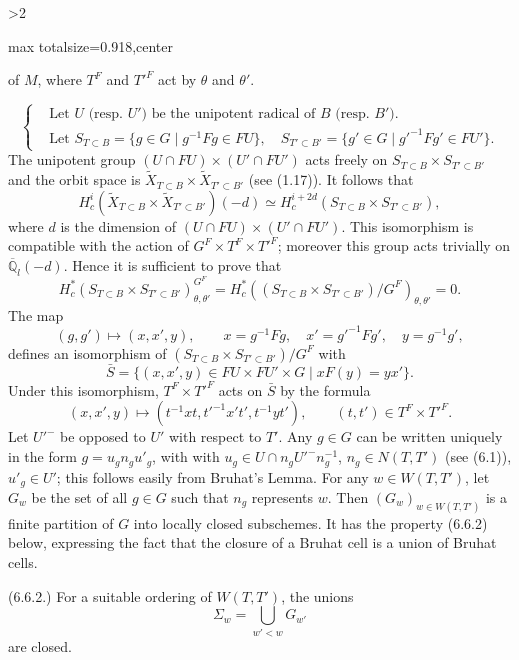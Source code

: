 \documentclass[9pt,twoside]{extarticle}
\newcommand{\EditionPage}[3]{%
  \ifnum#1>2\clearpage\fi
  \pdfbookmark[1]{Printed page #2}{en-folio-#2}%
  \hypertarget{en-physical-#1}{}%
  \noindent\begin{adjustbox}{max totalsize={\textwidth}{0.918\textheight},center}
  \begin{minipage}[t]{\textwidth}
  \fontsize{9.4}{11.1}\selectfont\justifying
  #3
  \end{minipage}
  \end{adjustbox}%
}
\begin{document}
\EditionPage{36}{137}{%
of \(M\), where \(T^F\) and \(T'^F\) act by \(\theta\) and \(\theta'\).\par

\[
\left\{
\begin{aligned}
&\text{Let }U\text{ (resp. }U'\text{) be the unipotent radical of }B\text{ (resp. }B'\text{).}\\
&\text{Let }S_{T\subset B}=\{g\in G\mid g^{-1}Fg\in FU\},\quad
S_{T'\subset B'}=\{g'\in G\mid g'^{-1}Fg'\in FU'\}.
\end{aligned}
\right.
\] The unipotent group \((U\cap FU)\times(U'\cap FU')\) acts freely on \(S_{T\subset B}\times S_{T'\subset B'}\) and the orbit space is \(\widetilde X_{T\subset B}\times\widetilde X_{T'\subset B'}\) (see (1.17)). It follows that \[
H_c^i(\widetilde X_{T\subset B}\times\widetilde X_{T'\subset B'})(-d)
\simeq
H_c^{i+2d}(S_{T\subset B}\times S_{T'\subset B'}),
\] where \(d\) is the dimension of \((U\cap FU)\times(U'\cap FU')\). This isomorphism is compatible with the action of \(G^F\times T^F\times T'^F\); moreover this group acts trivially on \(\overline{\mathbb Q}_l(-d)\). Hence it is sufficient to prove that \[
H_c^*(S_{T\subset B}\times S_{T'\subset B'})_{\theta,\theta'}^{G^F}
=
H_c^*((S_{T\subset B}\times S_{T'\subset B'})/G^F)_{\theta,\theta'}
=0.
\] The map \[
(g,g')\longmapsto(x,x',y),\qquad
x=g^{-1}Fg,\quad x'=g'^{-1}Fg',\quad y=g^{-1}g',
\] defines an isomorphism of \((S_{T\subset B}\times S_{T'\subset B'})/G^F\) with \[
\bar S=\{(x,x',y)\in FU\times FU'\times G\mid xF(y)=yx'\}.
\] Under this isomorphism, \(T^F\times T'^F\) acts on \(\bar S\) by the formula \[
\tag{6.6.1}
(x,x',y)\longmapsto(t^{-1}xt,t'^{-1}x't',t^{-1}yt'),
\qquad(t,t')\in T^F\times T'^F.
\] Let \(U'^{-}\) be opposed to \(U'\) with respect to \(T'\). Any \(g\in G\) can be written uniquely in the form \(g=u_gn_gu'_g\), with with \(u_g\in U\cap n_gU'^{-}n_g^{-1}\), \(n_g\in N(T,T')\) (see (6.1)), \(u'_g\in U'\); this follows easily from Bruhat's Lemma. For any \(w\in W(T,T')\), let \(G_w\) be the set of all \(g\in G\) such that \(n_g\) represents \(w\). Then \((G_w)_{w\in W(T,T')}\) is a finite partition of \(G\) into locally closed subschemes. It has the property (6.6.2) below, expressing the fact that the closure of a Bruhat cell is a union of Bruhat cells.\par

(6.6.2.) For a suitable ordering of \(W(T,T')\), the unions \[
\Sigma_w=\bigcup_{w'<w}G_{w'}
\] are closed.\par

}
\end{document}
